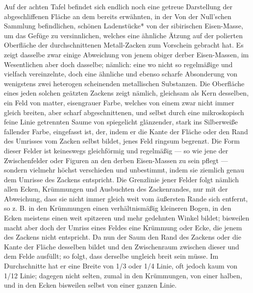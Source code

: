 \documentclass[a4paper, 11pt, oneside, german]{article}
\begin{document}
Auf der achten Tafel befindet sich endlich noch eine getreue Darstellung der abgeschliffenen Fläche an dem bereits erwähnten, in der Von der Null'schen Sammlung befindlichen, schönen Ladenstücke* von der sibirischen Eisen-Masse, um das Gefüge zu versinnlichen, welches eine ähnliche Ätzung auf der polierten Oberfläche der durchschnittenen Metall-Zacken zum Vorschein gebracht hat. Es zeigt dasselbe zwar einige Abweichung von jenem obiger derber Eisen-Massen, im Wesentlichen aber doch dasselbe; nämlich: eine wo nicht so regelmäßige und vielfach vereinzelnte, doch eine ähnliche und ebenso scharfe Absonderung von wenigstens zwei heterogen scheinenden metallischen Substanzen. Die Oberfläche eines jeden solchen geätzten Zackens zeigt nämlich, gleichsam als Kern desselben, ein Feld von matter, eisengrauer Farbe, welches von einem zwar nicht immer gleich breiten, aber scharf abgeschnittenen, und selbst durch eine mikroskopisch feine Linie getrennten Saume von spiegelicht glänzender, stark ins Silberweiße fallender Farbe, eingefasst ist, der, indem er die Kante der Fläche oder den Rand des Umrisses vom Zacken selbst bildet, jenes Feld ringsum begrenzt. Die Form dieser Felder ist keineswegs gleichförmig und regelmäßig --- so wie jene der Zwischenfelder oder Figuren an den derben Eisen-Massen zu sein pflegt --- sondern vielmehr höchst verschieden und unbestimmt, indem sie ziemlich genau dem Umrisse des Zackens entspricht. Die Grenzlinie jener Felder folgt nämlich allen Ecken, Krümmungen und Ausbuchten des Zackenrandes, nur mit der Abweichung, dass sie nicht immer gleich weit vom äußersten Rande sich entfernt, so z. B. in den Krümmungen einen verhältnismäßig kleineren Bogen, in den Ecken meistens einen weit spitzeren und mehr gedehnten Winkel bildet; bisweilen macht aber doch der Umriss eines Feldes eine Krümmung oder Ecke, die jenem des Zackens nicht entspricht. Da nun der Saum den Rand des Zackens oder die Kante der Fläche desselben bildet und den Zwischenraum zwischen dieser und dem Felde ausfüllt; so folgt, dass derselbe ungleich breit sein müsse. Im Durchschnitte hat er eine Breite von 1/3 oder 1/4 Linie, oft jedoch kaum von 1/12 Linie; dagegen nicht selten, zumal in den Krümmungen, von einer halben, und in den Ecken bisweilen selbst von einer ganzen Linie.
\end{document}
